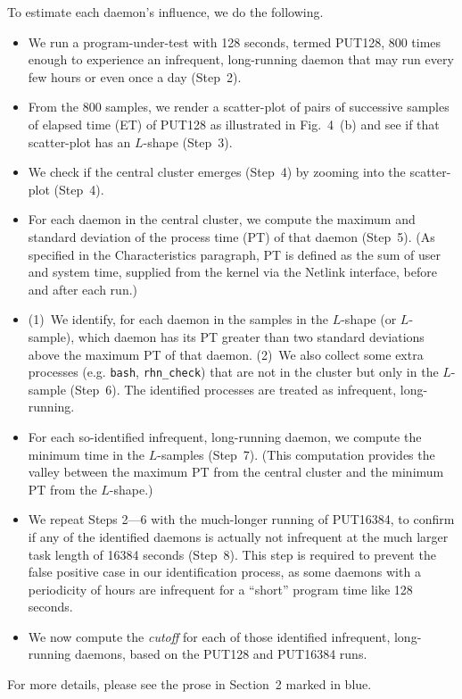 \documentclass[10pt,letterpaper]{article}
\begin{document}
To estimate each daemon's influence, we do the following. 
\begin{itemize}
\item We run a program-under-test with 128 seconds, termed PUT128, 800 times 
enough to experience an infrequent, long-running daemon 
that may run every few hours or even once a day (Step~2).

\item From the 800 samples, we render a scatter-plot of pairs of successive samples of elapsed time (ET) of PUT128
as illustrated in Fig.~4~(b) and see if that scatter-plot has an $L$-shape (Step~3). 

\item We check if the central cluster emerges (Step~4) by zooming into the scatter-plot (Step~4). 

\item For each daemon in the central cluster, we compute the maximum and standard deviation 
of the process time (PT) of that daemon (Step~5). (As specified in the Characteristics paragraph, PT is defined as 
the sum of user and system time, supplied from the kernel via the Netlink interface, before and after each run.) 

\item (1)~We identify, for each daemon in the samples in the $L$-shape (or $L$-sample), 
which daemon has its PT greater than two standard deviations above the maximum PT 
of that daemon. (2)~We also collect some extra processes (e.g. {\tt bash}, {\tt rhn\_check}) 
that are not in the cluster but only in the $L$-sample (Step~6). 
The identified processes are treated as infrequent, long-running. 

\item For each so-identified infrequent, long-running daemon, we compute the minimum time 
in the $L$-samples (Step~7). (This computation provides the valley between the maximum PT from 
the central cluster and the minimum PT from the $L$-shape.)

\item We repeat Steps 2---6 with the much-longer running of PUT16384, to confirm if 
any of the identified daemons is actually not infrequent at the much larger task length of 16384 seconds (Step~8).
This step is required to prevent the false positive case in our identification process, 
as some daemons with a periodicity of hours are infrequent for a ``short'' program time like 128 seconds.  

\item We now compute the {\em cutoff} for each of those identified infrequent, long-running daemons, 
based on the PUT128 and PUT16384 runs. 
\end{itemize}
 




For more details, please see the prose in Section~2 marked in blue. 
\end{document}

